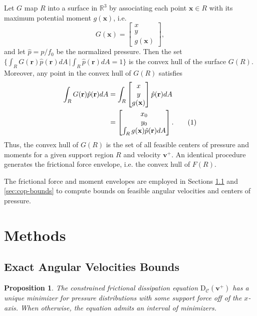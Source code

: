 \documentclass[conference]{IEEEtran}
\newtheorem{proposition}{Proposition}
\newcommand\numberthis{\addtocounter{equation}{1}\tag{\theequation}}
\begin{document}
Let $G$ map $R$ into a surface in $\mathbb{R}^3$ by associating each
point $\mathbf{x} \in R$ with its maximum potential moment
$g(\mathbf{x})$, i.e.
\begin{equation}
G(\mathbf{x}) =
\begin{bmatrix*}
  x\\
  y\\
  g(\mathbf{x})
\end{bmatrix*},
\end{equation}
and let $\hat{p} = p/f_0$ be the normalized pressure. Then the set
$\{\int_RG(\mathbf{r})\hat{p}(\mathbf{r})dA
\,|\int_R\hat{p}(\mathbf{r})dA=1 \}$
is the convex hull of the surface $G(R)$. Moreover, any point in the
convex hull of $G(R)$ satisfies
\begin{align*}
  \int_R G(\mathbf{r}) \hat{p}(\mathbf{r})dA &= \int_R 
  \begin{bmatrix*}
    x\\
    y\\
    g(\mathbf{x})
  \end{bmatrix*}
  \hat{p}(\mathbf{r})dA\\
  &= 
    \begin{bmatrix*}
      x_0\\
      y_0\\
      \int_R g(\mathbf{x}) \hat{p}(\mathbf{r})dA
    \end{bmatrix*}. \numberthis
\end{align*}
Thus, the convex hull of $G(R)$ is the set of all feasible centers of
pressure and moments for a given support region $R$ and velocity
$\mathbf{v}^+$. An identical procedure generates the frictional force
envelope, i.e. the convex hull of $F(R)$.

The frictional force and moment envelopes are employed in Sections
\ref{sec:exact-angular-velocity-bounds} and \ref{sec:cop-bounds} to
compute bounds on feasible angular velocities and centers of pressure.

\section{Methods}

\subsection{Exact Angular Velocities Bounds}\label{sec:exact-angular-velocity-bounds}

\begin{proposition}
  The constrained frictional dissipation equation
  $\mathrm{D}_{\mathcal{C}}(\mathbf{v}^+)$ has a unique minimizer for
  pressure distributions with some support force off of the
  $x$-axis. When otherwise, the equation admits an interval of
  minimizers.
\end{proposition}
\end{document}
